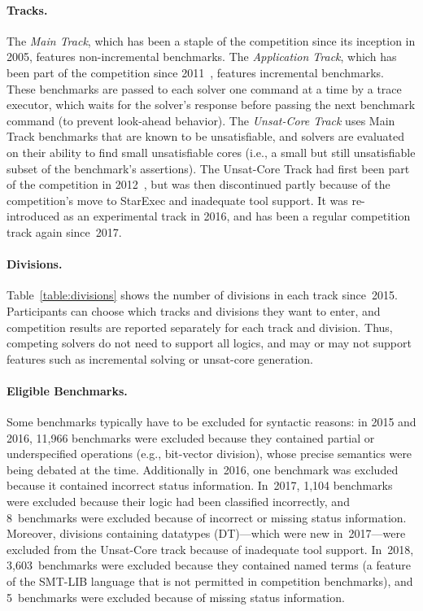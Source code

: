 \documentclass[dvipsnames,table,twoside,11pt]{article}
\newcommand{\maintrack}{Main Track\xspace}
\newcommand{\apptrack}{Application Track\xspace}
\newcommand{\ucoretrack}{Unsat-Core Track\xspace}
\begin{document}
\paragraph{Tracks.}
The \emph{\maintrack}, which
has been a staple of the competition since its
inception in 2005, features non-incremental benchmarks.  The
\emph{\apptrack}, which has been part of the competition since
2011~\cite{BDdMOS13}, features incremental benchmarks.  These
benchmarks are passed to each solver one command at a time by a trace
executor, which waits for the solver's response before passing the
next benchmark command (to prevent look-ahead behavior).  The
\emph{\ucoretrack} uses \maintrack benchmarks that are known to
be unsatisfiable, and solvers are evaluated on their ability to find
small unsatisfiable cores (i.e., a small but still unsatisfiable
subset of the benchmark's assertions).  The \ucoretrack had first
been part of the competition in 2012~\cite{CGBD12}, but was then
discontinued partly because of the competition's move to StarExec and
inadequate tool support.  It was re-introduced as an experimental track
in 2016, and has been a regular competition track again since~2017.

\paragraph{Divisions.}
Table~\ref{table:divisions} shows the number of divisions in each
track since~2015.  Participants can choose which tracks and divisions
they want to enter, and competition results are reported separately
for each track and division.  Thus, competing solvers do not need to support
all logics, and may or may not support features such as incremental solving
or unsat-core generation.

\paragraph{Eligible Benchmarks.}
Some benchmarks typically have to be
excluded for syntactic reasons: in 2015 and 2016, 11,966 benchmarks
were excluded because they contained partial or underspecified
operations (e.g., bit-vector division), whose precise semantics were
being debated at the time.  Additionally in~2016, one benchmark was
excluded because it contained incorrect status information.  In~2017,
1,104 benchmarks were excluded because their logic had been classified
incorrectly, and 8~benchmarks were excluded because of incorrect or
missing status information.  Moreover, divisions containing datatypes
({DT})---which were new in~2017---were excluded from the Unsat-Core
track because of inadequate tool support.  In~2018, 3,603~benchmarks were
excluded because they contained named terms (a feature of the SMT-LIB
language that is not permitted in competition benchmarks), and
5~benchmarks were excluded because of missing status information.
\end{document}
